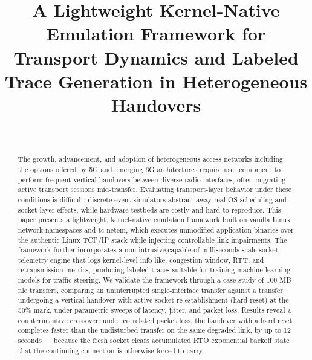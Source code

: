 \documentclass[conference]{IEEEtran}
\begin{document}
\title{A Lightweight Kernel-Native Emulation Framework for Transport Dynamics and Labeled Trace Generation in Heterogeneous Handovers}


\author{\\

			
	}


\maketitle

\begin{abstract}
The growth, advancement, and adoption of heterogeneous access networks including the options offered by  5G and emerging 6G architectures require user equipment to perform frequent vertical handovers between diverse radio interfaces, often migrating active transport sessions mid-transfer. Evaluating transport-layer behavior under these conditions is difficult: discrete-event simulators abstract away real OS scheduling and socket-layer effects, while hardware testbeds are costly and hard to reproduce. This paper presents a lightweight, kernel-native emulation framework built on vanilla Linux network namespaces and tc netem, which executes unmodified application binaries over the authentic Linux TCP/IP stack while injecting controllable link impairments. The framework further incorporates a non-intrusive,capable of milliseconds-scale socket telemetry engine that logs kernel-level info like, congestion window, RTT, and retransmission metrics, producing labeled traces suitable for training machine learning models for traffic steering. We validate the framework through a case study of 100 MB file transfers, comparing an uninterrupted single-interface transfer against a transfer undergoing a vertical handover with active socket re-establishment (hard reset) at the 50\% mark, under parametric sweeps of latency, jitter, and packet loss. Results reveal a counterintuitive crossover: under correlated packet loss, the handover with a hard reset completes faster than the undisturbed transfer on the same degraded link, by up to 12 seconds — because the fresh socket clears accumulated RTO exponential backoff state that the continuing connection is otherwise forced to carry.

\end{abstract}
\end{document}
